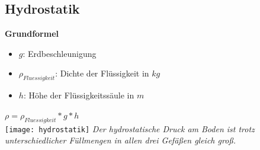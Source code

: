 \documentclass[a4paper,10pt]{article}
\begin{document}
\begin{multicols}{2}
  \section{Hydrostatik}
  \textbf{Grundformel}\\
  \begin{itemize}
    \item \(g\): Erdbeschleunigung
    \item \(\rho_{Fluessigkeit}\): Dichte der Flüssigkeit in \(kg\)
    \item \(h\): Höhe der Flüssigkeitssäule in \(m\)
  \end{itemize}
  \(\rho = \rho_{Fluessigkeit} * g * h\)\\
  \texttt{[image: hydrostatik]}
  \textit{Der hydrostatische Druck am Boden ist trotz unterschiedlicher Füllmengen in allen drei Gefäßen gleich groß.}
\end{multicols}
\end{document}
